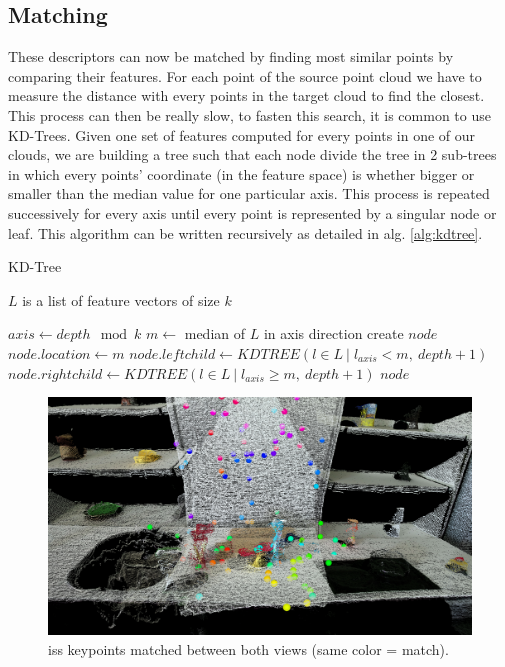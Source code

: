 \subsection{Matching}

    These descriptors can now be matched by finding most similar points by comparing their features. For each point of the source point cloud we have to measure the distance with every points in the target cloud to find the closest. \\
    This process can then be really slow, to fasten this search, it is common to use KD-Trees. Given one set of features computed for every points in one of our clouds, we are building a tree such that each node divide the tree in 2 sub-trees in which every points' coordinate (in the feature space) is whether bigger or smaller than the median value for one particular axis. This process is repeated successively for every axis until every point is represented by a singular node or leaf. This algorithm can be written recursively as detailed in alg. \ref{alg:kdtree}.
    
    \begin{algorithm}
        \caption{KD-Tree}\label{alg:kdtree}
        \REQUIRE $L$ is a list of feature vectors of size $k$
        \begin{algorithmic}[1]
                \State $axis \longleftarrow depth \mod{k}$
                \State $m \longleftarrow $ median of $L$ in axis direction
                \State create $node$
                \State $node.location \longleftarrow m$
                \State $node.leftchild \longleftarrow KDTREE({l \in L \:\vert\; l_{axis} < m}, \:depth + 1)$
                \State $node.rightchild \longleftarrow KDTREE({l \in L \:\vert\; l_{axis} \geq m}, \:depth + 1)$
                \State \Return $node$
            \EndFunction
        \end{algorithmic}
    \end{algorithm}
    
    \begin{figure}[h!]
        \centering
        \includegraphics[width=\textwidth]{images/kp_matches.png}
        \caption{\acrshort{iss} keypoints matched between both views (same color = match).}
        \label{fig:iss_match}
    \end{figure}
    

